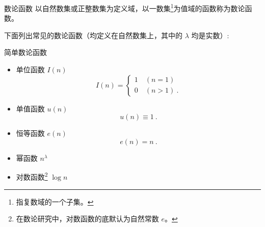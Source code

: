 

\begin{issues}
\issueDraft
\issueMissDepend
\end{issues}

\begin{definition}{数论函数}
以自然数集或正整数集为定义域，以一数集\footnote{指复数域的一个子集。}为值域的函数称为数论函数。
\end{definition}

下面列出常见的数论函数（均定义在自然数集上，其中的 $\lambda$ 均是实数）:
\begin{example}{简单数论函数}
\begin{itemize}
\item 单位函数 $I(n)$
\begin{equation}
I(n) =
\begin{cases}
1\quad (n = 1)\\
0\quad (n > 1)~.
\end{cases}
\end{equation}
\item 单值函数 $u(n)$
\begin{equation}
u(n)\equiv1~.
\end{equation}
\item 恒等函数 $e(n)$
\begin{equation}
e(n)=n~.
\end{equation}
\item 幂函数 $n^\lambda$
\item 对数函数\footnote{在数论研究中，对数函数的底默认为自然常数 $e$。} $\log n$
\end{itemize}
\end{example}
